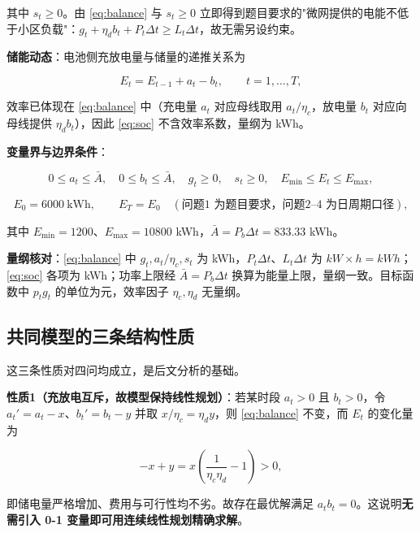 其中 $s_t\ge 0$。由 \cref{eq:balance} 与 $s_t\ge0$ 立即得到题目要求的"微网提供的电能不低于小区负载"：$g_t+\eta_d b_t+P_t\Delta t\ge L_t\Delta t$，故无需另设约束。

\textbf{储能动态}：电池侧充放电量与储量的递推关系为

\begin{equation}
  E_t=E_{t-1}+a_t-b_t,\qquad t=1,\dots,T,
  \label{eq:soc}
\end{equation}

效率已体现在 \cref{eq:balance} 中（充电量 $a_t$ 对应母线取用 $a_t/\eta_c$，放电量 $b_t$ 对应向母线提供 $\eta_d b_t$），因此 \cref{eq:soc} 不含效率系数，量纲为 \si{kWh}。

\textbf{变量界与边界条件}：

\begin{equation}
  0\le a_t\le \bar A,\quad 0\le b_t\le \bar A,\quad g_t\ge0,\quad s_t\ge0,\quad
  E_{\min}\le E_t\le E_{\max},
  \label{eq:bounds}
\end{equation}

\begin{equation}
  E_0=6000\ \text{kWh},\qquad E_T=E_0 \quad(\text{问题1 为题目要求，问题2--4 为日周期口径}),
  \label{eq:terminal}
\end{equation}

其中 $E_{\min}=1200$、$E_{\max}=10800$ \si{kWh}，$\bar A=P_b\Delta t=833.33$ \si{kWh}。

\textbf{量纲核对}：\cref{eq:balance} 中 $g_t,a_t/\eta_c,s_t$ 为 \si{kWh}，$P_t\Delta t$、$L_t\Delta t$ 为 $\si{kW}\times\si{h}=\si{kWh}$；\cref{eq:soc} 各项为 \si{kWh}；功率上限经 $\bar A=P_b\Delta t$ 换算为能量上限，量纲一致。目标函数中 $p_tg_t$ 的单位为元，效率因子 $\eta_c,\eta_d$ 无量纲。

\subsection{共同模型的三条结构性质}

这三条性质对四问均成立，是后文分析的基础。

\textbf{性质1（充放电互斥，故模型保持线性规划）}：若某时段 $a_t>0$ 且 $b_t>0$，令 $a_t'=a_t-x$、$b_t'=b_t-y$ 并取 $x/\eta_c=\eta_d y$，则 \cref{eq:balance} 不变，而 $E_t$ 的变化量为

\begin{equation}
  -x+y=x\left(\frac{1}{\eta_c\eta_d}-1\right)>0,
  \label{eq:mutex}
\end{equation}

即储电量严格增加、费用与可行性均不劣。故存在最优解满足 $a_tb_t=0$。这说明\textbf{无需引入 0-1 变量即可用连续线性规划精确求解}。

